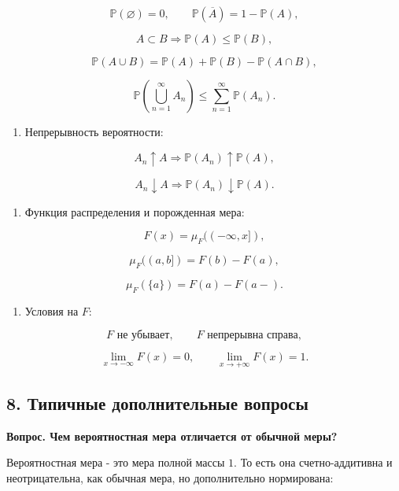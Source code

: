 \documentclass[
  11pt,
  a4paper,
]{article}
\providecommand{\tightlist}{%
  \setlength{\itemsep}{0pt}\setlength{\parskip}{0pt}}
\begin{document}
\[
\mathbb P(\varnothing)=0,\qquad
\mathbb P(\overline{A})=1-\mathbb P(A),
\]

\[
A\subset B\Rightarrow \mathbb P(A)\le\mathbb P(B),
\]

\[
\mathbb P(A\cup B)=\mathbb P(A)+\mathbb P(B)-\mathbb P(A\cap B),
\]

\[
\mathbb P\left(\bigcup_{n=1}^{\infty}A_n\right)
\le
\sum_{n=1}^{\infty}\mathbb P(A_n).
\]

\begin{enumerate}
\def\labelenumi{\arabic{enumi}.}
\setcounter{enumi}{3}
\tightlist
\item
  Непрерывность вероятности:
\end{enumerate}

\[
A_n\uparrow A\Rightarrow \mathbb P(A_n)\uparrow\mathbb P(A),
\]

\[
A_n\downarrow A\Rightarrow \mathbb P(A_n)\downarrow\mathbb P(A).
\]

\begin{enumerate}
\def\labelenumi{\arabic{enumi}.}
\setcounter{enumi}{4}
\tightlist
\item
  Функция распределения и порожденная мера:
\end{enumerate}

\[
F(x)=\mu_F((-\infty,x]),
\]

\[
\mu_F((a,b])=F(b)-F(a),
\]

\[
\mu_F(\{a\})=F(a)-F(a-).
\]

\begin{enumerate}
\def\labelenumi{\arabic{enumi}.}
\setcounter{enumi}{5}
\tightlist
\item
  Условия на \(F\):
\end{enumerate}

\[
F\text{ не убывает},\qquad
F\text{ непрерывна справа},
\]

\[
\lim_{x\to-\infty}F(x)=0,\qquad
\lim_{x\to+\infty}F(x)=1.
\]

\subsection{8. Типичные дополнительные
вопросы}\label{ux442ux438ux43fux438ux447ux43dux44bux435-ux434ux43eux43fux43eux43bux43dux438ux442ux435ux43bux44cux43dux44bux435-ux432ux43eux43fux440ux43eux441ux44b}

\textbf{Вопрос. Чем вероятностная мера отличается от обычной меры?}

Вероятностная мера - это мера полной массы \(1\). То есть она
счетно-аддитивна и неотрицательна, как обычная мера, но дополнительно
нормирована:
\end{document}
